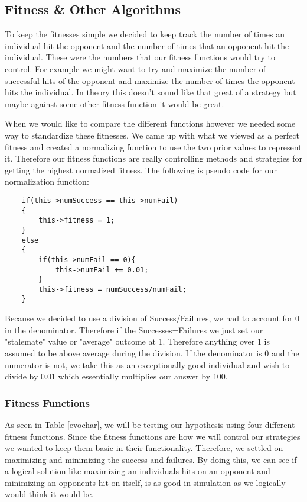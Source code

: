 \documentclass{acm_proc_article-sp}
\begin{document}
\subsection{Fitness \& Other Algorithms} %

To keep the fitnesses simple we decided to keep track the number of times an individual hit the opponent and the number of times that an opponent hit the individual. These were the numbers that our fitness functions would try to control. For example we might want to try and maximize the number of successful hits of the opponent and maximize the number of times the opponent hits the individual. In theory this doesn't sound like that great of a strategy but maybe against some other fitness function it would be great.

When we would like to compare the different functions however we needed some way to standardize these fitnesses. We came up with what we viewed as a perfect fitness and created a normalizing function to use the two prior values to represent it. Therefore our fitness functions are really controlling methods and strategies for getting the highest normalized fitness. The following is pseudo code for our normalization function:
\begin{lstlisting}
    if(this->numSuccess == this->numFail)
    {
        this->fitness = 1;
    }
    else
    {
        if(this->numFail == 0){
            this->numFail += 0.01;
        }
        this->fitness = numSuccess/numFail;
    }
\end{lstlisting}
Because we decided to use a division of Success/Failures, we had to account for 0 in the denominator. Therefore if the Successes=Failures we just set our "stalemate" value or "average" outcome at 1. Therefore anything over 1 is assumed to be above average during the division. If the denominator is 0 and the numerator is not, we take this as an exceptionally good individual and wish to divide by 0.01 which essentially multiplies our answer by 100.

\subsubsection{Fitness Functions}

As seen in Table \ref{evochar}, we will be testing our hypothesis using four different fitness functions. Since the fitness functions are how we will control our strategies we wanted to keep them basic in their functionality. Therefore, we settled on maximizing and minimizing the success and failures. By doing this, we can see if a logical solution like maximizing an individuals hits on an opponent and minimizing an opponents hit on itself, is as good in simulation as we logically would think it would be.
\end{document}
